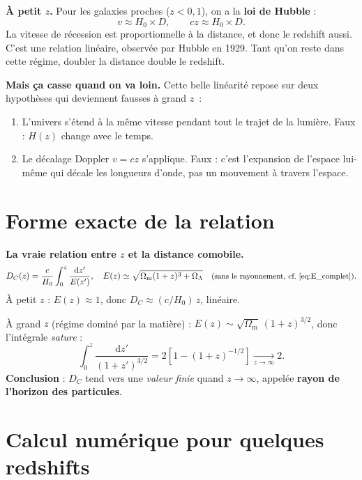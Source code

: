 \documentclass[11pt,a4paper,openany]{report}
\newcommand{\dif}{\mathrm{d}}
\newcommand{\Hzero}{H_{0}}
\newcommand{\Om}{\Omega_{\mathrm{m}}}
\newcommand{\OL}{\Omega_{\Lambda}}
\begin{document}
\begin{tcolorbox}[vulgarisation]
\textbf{À petit $z$.} Pour les galaxies proches ($z < 0{,}1$), on a la
\textbf{loi de Hubble} :
\[
v \approx \Hzero \times D, \qquad cz \approx \Hzero \times D.
\]
La vitesse de récession est proportionnelle à la distance, et donc le redshift
aussi. C'est une relation linéaire, observée par Hubble en 1929. Tant qu'on
reste dans cette régime, doubler la distance double le redshift.

\medskip
\textbf{Mais ça casse quand on va loin.} Cette belle linéarité repose sur deux
hypothèses qui deviennent fausses à grand $z$~:
\begin{enumerate}[topsep=2pt]
\item L'univers s'étend à la même vitesse pendant tout le trajet de la lumière.
  Faux : $H(z)$ change avec le temps.
\item Le décalage Doppler $v = cz$ s'applique. Faux : c'est l'expansion de
  l'espace lui-même qui décale les longueurs d'onde, pas un mouvement à
  travers l'espace.
\end{enumerate}
\end{tcolorbox}

\section{Forme exacte de la relation}

\begin{tcolorbox}[mathspe]
\textbf{La vraie relation entre $z$ et la distance comobile.}
\[
D_{C}(z) = \frac{c}{\Hzero}\int_{0}^{z}\frac{\dif z'}{E(z')},
\quad E(z) \simeq \sqrt{\Om(1+z)^{3} + \OL}
\quad\text{\small(sans le rayonnement, cf.~\eqref{eq:E_complet})}.
\]
À petit $z$ : $E(z) \approx 1$, donc $D_C \approx (c/\Hzero)\,z$, linéaire.

\medskip
À grand $z$ (régime dominé par la matière) : $E(z) \sim \sqrt{\Om}\,(1+z)^{3/2}$,
donc l'intégrale \emph{sature} :
\[
\int_{0}^{z}\frac{\dif z'}{(1+z')^{3/2}}
  = 2\left[1 - (1+z)^{-1/2}\right] \xrightarrow[z\to\infty]{} 2.
\]
\textbf{Conclusion} : $D_C$ tend vers une \emph{valeur finie} quand $z\to\infty$,
appelée \textbf{rayon de l'horizon des particules}.
\end{tcolorbox}

\section{Calcul numérique pour quelques redshifts}
\end{document}
